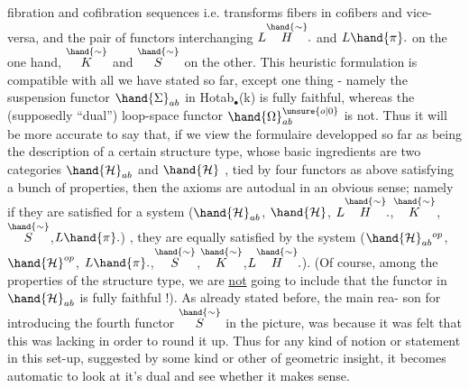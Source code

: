 
fibration and cofibration sequences i.e. transforms fibers in cofibers
and vice-versa, and the pair of functors interchanging $L\overset{\hand{\sim}}{H}.$ and $L\hand{\pi}.$
on the one hand, $\overset{\hand{\sim}}{K}$ and $\overset{\hand{\sim}}{S}$ on the other. This heuristic formulation is
compatible with all we have stated so far, except one thing - namely
the suspension functor $\hand{\Sigma}_{ab}$ in Hotab$_{\bullet}$(k) is fully faithful, whereas the
(supposedly ``dual'') loop-space functor $\hand{\Omega}^{\unsure{o|0}}_{ab}$ is not. Thus it will be more
accurate to say that, if we view the formulaire developped so far as
being  the description of a certain structure type, whose basic
ingredients are two categories $\hand{\mathcal{H}}_{ab}$ and $\hand{\mathcal{H}}$ ,  tied by four functors
as above satisfying a bunch of properties, then the axioms are autodual
in an obvious sense; namely if they are satisfied for a system 
($\hand{\mathcal{H}}_{ab}$, $\hand{\mathcal{H}}$, $L\overset{\hand{\sim}}{H}.$,$\overset{\hand{\sim}}{K}$,$\overset{\hand{\sim}}{S}$,$L\hand{\pi}.$) , they are equally satisfied by the system
($\hand{\mathcal{H}}_{ab}{}^{op}$,$\hand{\mathcal{H}}^{op}$, $L\hand{\pi}.$,$\overset{\hand{\sim}}{S}$,$\overset{\hand{\sim}}{K}$,$L\overset{\hand{\sim}}{H}.$). (Of course, among the properties of the
structure type, we are \uline{not} going to include that the   functor
in $\hand{\mathcal{H}}_{ab}$ is fully faithful !). As already stated before, the main rea-%
son for introducing the fourth functor $\overset{\hand{\sim}}{S}$ in the picture, was because it
was felt that this was lacking in  order to round it up. Thus
for any kind of notion or statement in this set-up, suggested by some
kind or other of geometric insight, it becomes automatic to look at
it's dual and see whether it makes sense.\hand{$\rceil$}

